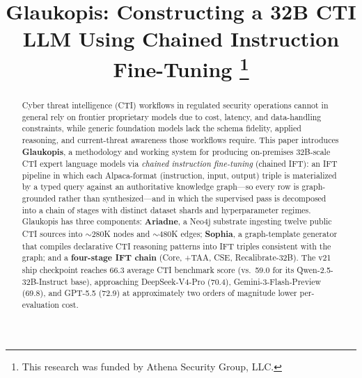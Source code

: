 \documentclass[conference]{IEEEtran}
\begin{document}
\title{Glaukopis: Constructing a 32B CTI LLM Using Chained Instruction Fine-Tuning
\thanks{This research was funded by Athena Security Group, LLC.}
}

\author{%
%
}

\maketitle

\begin{abstract}
Cyber threat intelligence (CTI) workflows in regulated security operations cannot in general rely on frontier proprietary models due to cost, latency, and data-handling constraints, while generic foundation models lack the schema fidelity, applied reasoning, and current-threat awareness those workflows require. This paper introduces \textbf{Glaukopis}, a methodology and working system for producing on-premises 32B-scale CTI expert language models via \textit{chained instruction fine-tuning} (chained IFT): an IFT pipeline in which each Alpaca-format (instruction, input, output) triple is materialized by a typed query against an authoritative knowledge graph---so every row is graph-grounded rather than synthesized---and in which the supervised pass is decomposed into a chain of stages with distinct dataset shards and hyperparameter regimes. Glaukopis has three components: \textbf{Ariadne}, a Neo4j substrate ingesting twelve public CTI sources into ${\sim}280$K nodes and ${\sim}480$K edges; \textbf{Sophia}, a graph-template generator that compiles declarative CTI reasoning patterns into IFT triples consistent with the graph; and a \textbf{four-stage IFT chain} (Core, +TAA, CSE, Recalibrate-32B). The v21 ship checkpoint reaches 66.3 average CTI benchmark score (vs.\ 59.0 for its Qwen-2.5-32B-Instruct base), approaching DeepSeek-V4-Pro (70.4), Gemini-3-Flash-Preview (69.8), and GPT-5.5 (72.9) at approximately two orders of magnitude lower per-evaluation cost.
\end{abstract}
\end{document}
